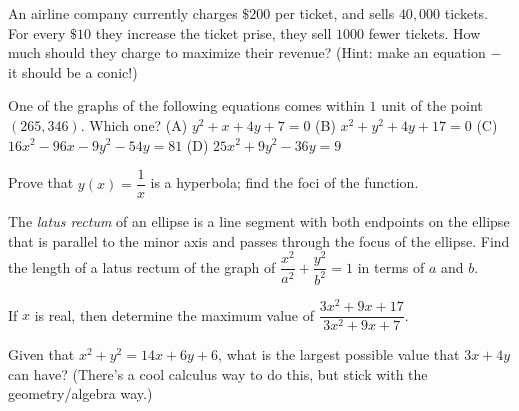 \documentclass[../book.tex]{subfiles}
\begin{document}
\begin{challengeset}
\item An airline company currently charges $\$200$ per ticket, and sells $40,000$ tickets. For every $\$10$ they increase the ticket prise, they sell $1000$ fewer tickets. How much should they charge to maximize their revenue? (Hint: make an equation $-$ it should be a conic!) \vspace{3mm}
\item One of the graphs of the following equations comes within $1$ unit of the point $(265,346)$. Which one? \newline 
(A) $y^2+x+4y+7=0$  (B) $x^2+y^2+4y+17=0$  \newline
(C) $16x^2-96x-9y^2-54y=81$  (D) $25x^2+9y^2-36y=9$  \vspace{3mm}
\item Prove that $y(x)=\dfrac{1}{x}$ is a hyperbola; find the foci of the function. \vspace{3mm}
\item The \textit{latus rectum} of an ellipse is a line segment with both endpoints on the ellipse that is parallel to the minor axis and passes through the focus of the ellipse.  Find the length of a latus rectum of the graph of $\dfrac{x^2}{a^2}+\dfrac{y^2}{b^2}=1$ in terms of $a$ and $b$. \vspace{3mm}
\item If $x$ is real, then determine the maximum value of $\dfrac{3x^2+9x+17}{3x^2+9x+7}$. \vspace{3mm}
\item Given that $x^2+y^2=14x+6y+6$, what is the largest possible value that $3x+4y$ can have? (There's a cool calculus way to do this, but stick with the geometry/algebra way.)\vspace{3mm}
\end{challengeset}
\end{document}
